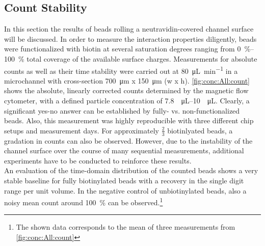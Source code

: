 \subsection{Count Stability}
In this section the results of beads rolling a neutravidin-covered channel surface will be discussed. In order to measure the interaction properties diligently, beads were functionalized with biotin at several saturation degrees ranging from \SIrange{0}{100}{\percent} total coverage of the available surface charges. Measurements for absolute counts as well as their time stability were carried out at \SI{80}{\micro\liter\per\minute} in a microchannel with cross-section \SI{700}{\micro\meter} x \SI{150}{\micro\meter}  (w x h). \cref{fig:conc:All:count} shows the absolute, linearly corrected counts determined by the magnetic flow cytometer, with a defined particle concentration of \SIrange{7.8}{10}{\per\micro\liter}. Clearly, a significant yes-no answer can be established by fully- vs. non-functionalized beads. Also, this measurement was highly reproducible with three different chip setups and measurement days. For approximately $\frac{2}{3}$ biotinlyated beads, a gradation in counts can also be observed. However, due to the instability of the channel surface over the course of many sequential measurements, additional experiments have to be conducted to reinforce these results. \\
An evaluation of the time-domain distribution of the counted beads shows a very stable baseline for fully biotinylated beads with a recovery in the single digit range per unit volume. In the negative control of unbiotinylated beads, also a noisy mean count around \SI{100}{\percent} can be observed.\footnote{The shown data corresponds to the mean of three measurements from \cref{fig:conc:All:count}}
\begin{figure}[!h]
	\centering
	 \hfill
	\addtocounter{subfigure}{-1}
	\label{fig:conc:All}
\end{figure}

